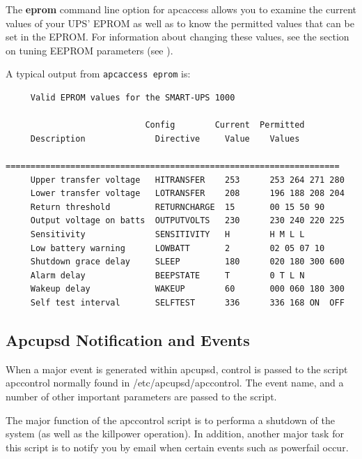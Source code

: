 {{{{\label{index-apcaccess-eeprom-114}
\label{index-eeprom_002c-apcaccess-115}
The {\bf eprom} command line option for apcaccess allows you to examine the
current values of your UPS' EPROM as well as to know the permitted values that
can be set in the EPROM. For information about changing these values, see the
section on tuning EEPROM parameters (see 
).  

A typical output from {\tt apcaccess eprom} is: 

\footnotesize
\begin{verbatim}
     Valid EPROM values for the SMART-UPS 1000
     
                            Config        Current  Permitted
     Description              Directive     Value    Values
     ===================================================================
     Upper transfer voltage   HITRANSFER    253      253 264 271 280
     Lower transfer voltage   LOTRANSFER    208      196 188 208 204
     Return threshold         RETURNCHARGE  15       00 15 50 90
     Output voltage on batts  OUTPUTVOLTS   230      230 240 220 225
     Sensitivity              SENSITIVITY   H        H M L L
     Low battery warning      LOWBATT       2        02 05 07 10
     Shutdown grace delay     SLEEP         180      020 180 300 600
     Alarm delay              BEEPSTATE     T        0 T L N
     Wakeup delay             WAKEUP        60       000 060 180 300
     Self test interval       SELFTEST      336      336 168 ON  OFF
\end{verbatim}
\normalsize

\label{Apcupsd-Notification-and-Events}

\subsection*{Apcupsd Notification and Events}

\label{index-Notification-116}
\label{index-Events-117}
When a major event is generated within apcupsd, control is passed to the
script apccontrol normally found in /etc/apcupsd/apccontrol. The event name,
and a number of other important parameters are passed to the script.  

The major function of the apccontrol script is to performa a shutdown of the
system (as well as the killpower operation). In addition, another major task
for this script is to notify you by email when certain events such as
powerfail occur.  

}}}}
